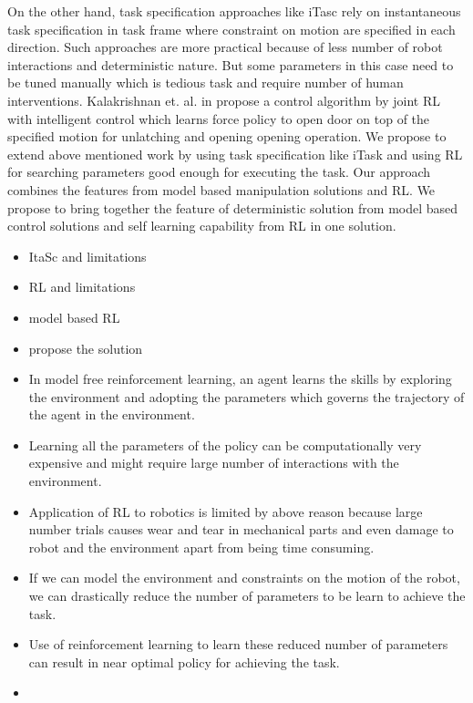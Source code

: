 \documentclass[thesis]{mas_proposal}
\begin{document}
On the other hand, task specification approaches like iTasc rely on instantaneous task specification in task frame where constraint on motion are specified in each direction. Such approaches are more practical because of less number of robot interactions and deterministic nature. But some parameters in this case need to be tuned manually which is tedious task and require number of human interventions. 
Kalakrishnan et. al. in \cite{kalakrishnan2011learning} propose a control algorithm by joint RL with intelligent control which learns force policy to open door on top of the specified motion for unlatching and opening opening operation.
We propose to extend above mentioned work by using task specification like iTask and using RL for searching parameters good enough for executing the task. Our approach combines the features from model based manipulation solutions and RL. We propose to bring together the feature of deterministic solution from model based control solutions and self learning capability from RL in one solution.  
\begin{itemize}
	\item ItaSc and limitations
	\item RL and limitations
	\item model based RL
	\item propose the solution
\end{itemize}
\begin{itemize}
	\item In model free reinforcement learning, an agent learns the skills by exploring the environment and adopting the parameters which governs the trajectory of the agent in the environment.
	\item Learning all the parameters of the policy can be computationally very expensive and might require large number of interactions with the environment.
	\item Application of RL to robotics is limited by above reason because large number trials causes wear and tear in mechanical parts and even damage to robot and the environment apart from being time consuming. 
	\item If we can model the environment and constraints on the motion of the robot, we can drastically reduce the number of parameters to be learn to achieve the task.
	\item Use of reinforcement learning to learn these reduced number of parameters can result in near optimal policy for achieving the task.
	\item 
\end{itemize}
\end{document}
